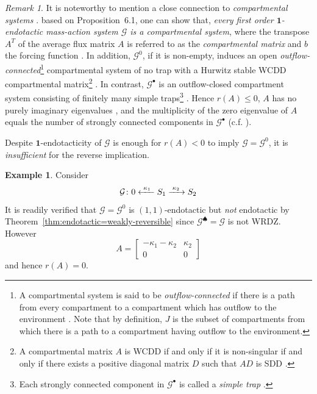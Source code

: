 \documentclass[10pt]{amsart}
\numberwithin{equation}{section}
\theoremstyle{plain}
\theoremstyle{definition}
\newtheorem{example}[theorem]{Example}
\theoremstyle{remark}
\newtheorem{remark}[theorem]{Remark}
\newcommand{\cG}{\mathcal{G}}
\begin{document}
\begin{remark}\label{re:compartmental-system}
{It is noteworthy to mention a close connection to \emph{compartmental systems} \cite{JS93}. based on Proposition~6.1, one can show that, \emph{every first order $\mathbf{1}$-endotactic mass-action system $\mathcal{G}$ is a compartmental system}, where the transpose $A^T$ of the average flux matrix $A$ is referred to as the \emph{compartmental matrix} and $b$ the forcing function \cite[Section~7B]{A83}. 
In addition, $\mathcal{G}^{0}$, if it is non-empty, induces an open \emph{outflow-connected}\footnote{A compartmental system is said to be \emph{outflow-connected} if there is a path from every compartment to a compartment which has outflow to the environment \cite{JS93}. Note that by definition, $J$ is the subset of compartments from which there is a path to a compartment having outflow to the environment.} compartmental system of no trap with a Hurwitz stable WCDD compartmental matrix\footnote{{A compartmental matrix $A$ is WCDD if and only if it is non-singular if and only if there exists a positive diagonal matrix $D$ such that $AD$ is SDD \cite{JS93,AF16}.}} \cite[Theorem~3]{JS93}. In contrast, $\mathcal{G}^{\bullet}$ is an outflow-closed compartment system consisting of finitely many {simple traps}\footnote{Each strongly connected component in $\mathcal{G}^{\bullet}$ is called a \emph{simple trap} \cite{JS93}.} \cite{JS93}. Hence $r(A)\le0$, $A$ has no purely imaginary eigenvalues \cite[Theorem~12.1]{A83}, and the multiplicity of the zero eigenvalue  of $A$ equals the number of strongly connected components in $\mathcal{G}^{\bullet}$ \cite{FJ75} (c.f. \cite[Theorem~2]{JS93}).} 
\end{remark}

Despite $\mathbf{1}$-endotacticity of $\cG$ is enough for $r(A)<0$ to imply $\cG=\cG^0$, it is \emph{insufficient} for the reverse implication.
\begin{example}
Consider
\[\cG\colon 0\ce{<-[$\kappa_1$]}S_1\ce{->[$\kappa_2$]}S_2\]
It is readily verified that $\cG=\cG^0$ is $(1,1)$-endotactic but \emph{not} endotactic by Theorem~\ref{thm:endotactic=weakly-reversible} since $\cG^{\spadesuit}=\cG$ is not WRDZ. However \[A=\begin{bmatrix}
-\kappa_1-\kappa_2&\kappa_2\\
0&0
\end{bmatrix}\]
and hence $r(A)=0$.
\end{example}
\end{document}
